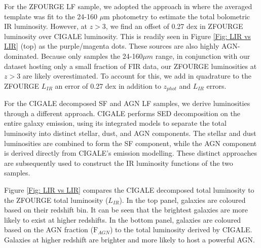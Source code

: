 For the ZFOURGE LF sample, we adopted the approach in \cite{straatman_fourstar_2016} where the averaged \cite{wuyts_fireworks_2008} template was fit to the 24-160 $\mu$m photometry to estimate the total bolometric IR luminosity. However, at $z>3$, we find an offset of 0.27 dex in ZFOURGE luminosity over CIGALE luminosity. This is readily seen in Figure \ref{Fig: LIR vs LIR} (top) as the purple/magenta dots. These sources are also highly AGN-dominated. Because \cite{wuyts_fireworks_2008} only samples the 24-160$\mu m$ range, in conjunction with our dataset hosting only a small fraction of FIR data, our ZFOURGE luminosities at $z>3$ are likely overestimated. To account for this, we add in quadrature to the ZFOURGE $L_{IR}$ an error of 0.27 dex in addition to $z_{phot}$ and $L_{IR}$ errors.

For the CIGALE decomposed SF and AGN LF samples, we derive luminosities through a different approach. CIGALE performs SED decomposition on the entire galaxy emission, using its integrated models to separate the total luminosity into distinct stellar, dust, and AGN components. The stellar and dust luminosities are combined to form the SF component, while the AGN component is derived directly from CIGALE's emission modelling. These distinct approaches are subsequently used to construct the IR luminosity functions of the two samples. 

Figure \ref{Fig: LIR vs LIR} compares the CIGALE decomposed total luminosity to the ZFOURGE total luminosity ($L_{IR}$). In the top panel, galaxies are coloured based on their redshift bin. It can be seen that the brightest galaxies are more likely to exist at higher redshifts. In the bottom panel, galaxies are coloured based on the AGN fraction ($\mathrm{F}_{AGN}$) to the total luminosity derived by CIGALE. Galaxies at higher redshift are brighter and more likely to host a powerful AGN.

